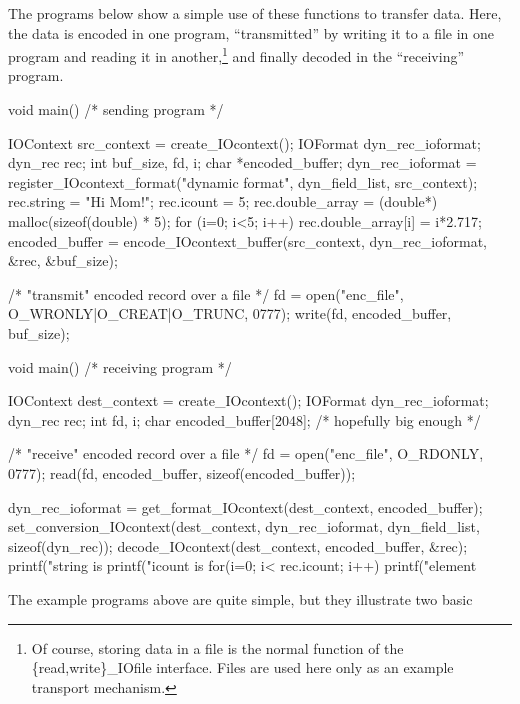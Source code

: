 The programs below show a simple use of these functions to transfer data.
Here, the data is encoded in one program, ``transmitted'' by writing it to a
file in one program and reading it in another,\footnote{Of course, storing
data in a file is the normal function of the \{read,write\}\_IOfile
interface.  Files are used here only as an example transport mechanism.}
and finally decoded in the ``receiving'' program.  
\label{contextcode}
\begin{Code}
void main()     /* sending program */
{
    IOContext src_context = create_IOcontext();
    IOFormat dyn_rec_ioformat;
    dyn_rec rec;
    int buf_size, fd, i;
    char *encoded_buffer;
    dyn_rec_ioformat = register_IOcontext_format("dynamic format",
                                                  dyn_field_list,
                                                  src_context);
    rec.string = "Hi Mom!";
    rec.icount = 5;
    rec.double_array = (double*) malloc(sizeof(double) * 5);
    for (i=0; i<5; i++) 
        rec.double_array[i] = i*2.717;
    encoded_buffer = encode_IOcontext_buffer(src_context, 
                        dyn_rec_ioformat, &rec, &buf_size);

    /* "transmit" encoded record over a file */
    fd = open("enc_file", O_WRONLY|O_CREAT|O_TRUNC, 0777);
    write(fd, encoded_buffer, buf_size);
}
\end{Code}
\begin{Code}
void main()     /* receiving program */
{
    IOContext dest_context = create_IOcontext();
    IOFormat dyn_rec_ioformat;
    dyn_rec rec;
    int fd, i;
    char encoded_buffer[2048];  /* hopefully big enough */

    /* "receive" encoded record over a file */
    fd = open("enc_file", O_RDONLY, 0777);
    read(fd, encoded_buffer, sizeof(encoded_buffer));

    dyn_rec_ioformat = get_format_IOcontext(dest_context, encoded_buffer);
    set_conversion_IOcontext(dest_context, dyn_rec_ioformat,
                             dyn_field_list, sizeof(dyn_rec));
    decode_IOcontext(dest_context, encoded_buffer, &rec);
    printf("string is %
    printf("icount is %
    for(i=0; i< rec.icount; i++)
        printf("element %
}
\end{Code}
The example programs above are quite simple, but they illustrate two basic

